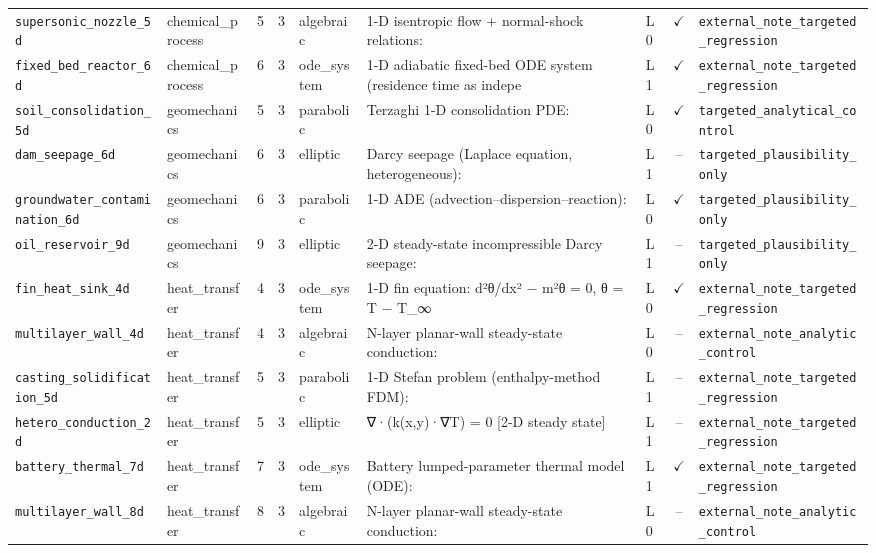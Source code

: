 \begin{table}[htbp]
\begin{tabular}{@{}llcclllcl@{}}
\texttt{supersonic\_nozzle\_5d} & chemical\_process & 5 & 3 & algebraic & 1-D isentropic flow + normal-shock relations: & L0 & $\checkmark$ & \texttt{external\_note\_targeted\_regression} \\
\texttt{fixed\_bed\_reactor\_6d} & chemical\_process & 6 & 3 & ode\_system & 1-D adiabatic fixed-bed ODE system (residence time as indepe & L1 & $\checkmark$ & \texttt{external\_note\_targeted\_regression} \\
\texttt{soil\_consolidation\_5d} & geomechanics & 5 & 3 & parabolic & Terzaghi 1-D consolidation PDE: & L0 & $\checkmark$ & \texttt{targeted\_analytical\_control} \\
\texttt{dam\_seepage\_6d} & geomechanics & 6 & 3 & elliptic & Darcy seepage (Laplace equation, heterogeneous): & L1 & -- & \texttt{targeted\_plausibility\_only} \\
\texttt{groundwater\_contamination\_6d} & geomechanics & 6 & 3 & parabolic & 1-D ADE (advection–dispersion–reaction): & L0 & $\checkmark$ & \texttt{targeted\_plausibility\_only} \\
\texttt{oil\_reservoir\_9d} & geomechanics & 9 & 3 & elliptic & 2-D steady-state incompressible Darcy seepage: & L1 & -- & \texttt{targeted\_plausibility\_only} \\
\texttt{fin\_heat\_sink\_4d} & heat\_transfer & 4 & 3 & ode\_system & 1-D fin equation: d²θ/dx² − m²θ = 0, θ = T − T\_∞ & L0 & $\checkmark$ & \texttt{external\_note\_targeted\_regression} \\
\texttt{multilayer\_wall\_4d} & heat\_transfer & 4 & 3 & algebraic & N-layer planar-wall steady-state conduction: & L0 & -- & \texttt{external\_note\_analytic\_control} \\
\texttt{casting\_solidification\_5d} & heat\_transfer & 5 & 3 & parabolic & 1-D Stefan problem (enthalpy-method FDM): & L1 & -- & \texttt{external\_note\_targeted\_regression} \\
\texttt{hetero\_conduction\_2d} & heat\_transfer & 5 & 3 & elliptic & ∇·(k(x,y)·∇T) = 0  [2-D steady state] & L1 & -- & \texttt{external\_note\_targeted\_regression} \\
\texttt{battery\_thermal\_7d} & heat\_transfer & 7 & 3 & ode\_system & Battery lumped-parameter thermal model (ODE): & L1 & $\checkmark$ & \texttt{external\_note\_targeted\_regression} \\
\texttt{multilayer\_wall\_8d} & heat\_transfer & 8 & 3 & algebraic & N-layer planar-wall steady-state conduction: & L0 & -- & \texttt{external\_note\_analytic\_control} \\

\end{tabular}
\end{table}
